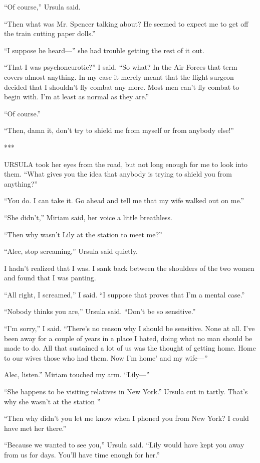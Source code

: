 \documentclass{novel}
\begin{document}
“Of course,” Ursula said.

“Then what was Mr. Spencer talking about? He seemed to expect me to get off the train cutting paper dolls.”

“I suppose he heard—” she had trouble getting the rest of it out.

“That I was psychoneurotic?” I said. “So what? In the Air Forces that term covers almost anything. In my case it merely meant that the flight surgeon decided that I shouldn’t fly combat any more. Most men can’t fly combat to begin with. I’m at least as normal as they are.”

“Of course.”

“Then, damn it, don’t try to shield me from myself or from anybody else!”

***

URSULA took her eyes from the road, but not long enough for me to look into them. “What gives you the idea that anybody is trying to shield you from anything?”

“You do. I can take it. Go ahead and tell me that my wife walked out on me.”

“She didn’t,” Miriam said, her voice a little breathless.

“Then why wasn’t Lily at the station to meet me?”

“Alec, stop screaming,” Ursula said quietly.

I hadn’t realized that I was. I sank back between the shoulders of the two women and found that I was panting.

“All right, I screamed,” I said. “I suppose that proves that I’m a mental case.”

“Nobody thinks you are,” Ursula said. “Don’t be so sensitive.”

“I’m sorry,” I said. “There’s no reason why I should be sensitive. None at all. I’ve been away for a couple of years in a place I hated, doing what no man should be made to do. All that sustained a lot of us was the thought of getting home. Home to our wives those who had them. Now I’m home’ and my wife—”

Alec, listen.” Miriam touched my arm. “Lily—”

“She happens to be visiting relatives in New York.” Ursula cut in tartly. That’s why she wasn’t at the station ”

“Then why didn’t you let me know when I phoned you from New York? I could have met her there.”

“Because we wanted to see you,” Ursula said. “Lily would have kept you away from us for days. You’ll have time enough for her.”
\end{document}
